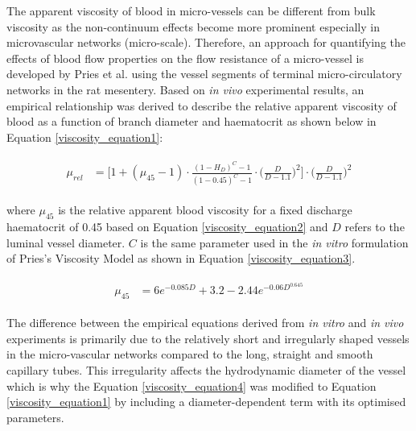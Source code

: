 \noindent The apparent viscosity of blood in micro-vessels can be different from bulk viscosity as the non-continuum effects become more prominent especially in microvascular networks (micro-scale). Therefore, an approach for quantifying the effects of blood flow properties on the flow resistance of a micro-vessel is developed by Pries et al.\cite{PriesAR1994RtBF} using the vessel segments of terminal micro-circulatory networks in the rat mesentery. Based on \textit{in vivo} experimental results, an empirical relationship was derived to describe the relative apparent viscosity of blood as a function of branch diameter and haematocrit as shown below in Equation \ref{viscosity_equation1}:

\begin{eqnarray}
\label{viscosity_equation1}
\begin{aligned}
\mu_{rel} & = \bigg[1 + (\mu_{45} - 1) \cdot \frac{(1-H_{D})^{C} - 1}{(1-0.45)^{C} - 1} \cdot \bigg(\frac{D}{D - 1.1}\bigg)^{2} \bigg] \cdot \bigg(\frac{D}{D - 1.1}\bigg)^{2}
\end{aligned}
\end{eqnarray}

\bigskip

\noindent where $\mu_{45}$ is the relative apparent blood viscosity for a fixed discharge haematocrit of 0.45 based on Equation \ref{viscosity_equation2} and $D$ refers to the luminal vessel diameter. $C$ is the same parameter used in the \textit{in vitro} formulation of Pries's Viscosity Model as shown in Equation \ref{viscosity_equation3}.

\begin{eqnarray}
\label{viscosity_equation2}
\begin{aligned}
\mu_{45} & = 6 e^{-0.085D} + 3.2 - 2.44e^{-0.06D^{0.645}}
\end{aligned}
\end{eqnarray}

\bigskip

\noindent The difference between the empirical equations derived from \textit{in vitro} and \textit{in vivo} experiments is primarily due to the relatively short and irregularly shaped vessels in the micro-vascular networks compared to the long, straight and smooth capillary tubes. This irregularity affects the hydrodynamic diameter of the vessel which is why the Equation \ref{viscosity_equation4} was modified to Equation \ref{viscosity_equation1} by including a diameter-dependent term with its optimised parameters. \\

